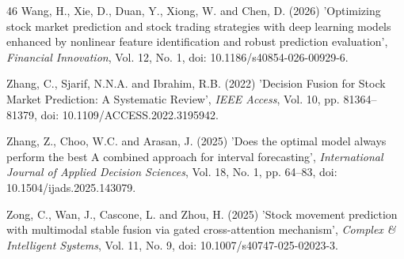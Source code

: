 \documentclass{singlecol-new}
\theoremstyle{TH}{
\newtheorem{lemma}{Lemma}
\newtheorem{theorem}[lemma]{Theorem}
\newtheorem{corrolary}[lemma]{Corrolary}
\newtheorem{conjecture}[lemma]{Conjecture}
\newtheorem{proposition}[lemma]{Proposition}
\newtheorem{claim}[lemma]{Claim}
\newtheorem{stheorem}[lemma]{Wrong Theorem}
\newtheorem{algorithm}{Algorithm}
}
\theoremstyle{THrm}{
\newtheorem{definition}{Definition}[section]
\newtheorem{question}{Question}[section]
\newtheorem{remark}{Remark}
\newtheorem{scheme}{Scheme}
}
\theoremstyle{THhit}{
\newtheorem{case}{Case}[section]
}
\begin{document}
\begin{thebibliography}{46}
Wang, H., Xie, D., Duan, Y., Xiong, W. and Chen, D. (2026) 'Optimizing stock market prediction and stock trading strategies with deep learning models enhanced by nonlinear feature identification and robust prediction evaluation', {\it Financial Innovation}, Vol. 12, No. 1, doi: 10.1186/s40854-026-00929-6.

Zhang, C., Sjarif, N.N.A. and Ibrahim, R.B. (2022) 'Decision Fusion for Stock Market Prediction: A Systematic Review', {\it IEEE Access}, Vol. 10, pp. 81364--81379, doi: 10.1109/ACCESS.2022.3195942.

Zhang, Z., Choo, W.C. and Arasan, J. (2025) 'Does the optimal model always perform the best A combined approach for interval forecasting', {\it International Journal of Applied Decision Sciences}, Vol. 18, No. 1, pp. 64--83, doi: 10.1504/ijads.2025.143079.

Zong, C., Wan, J., Cascone, L. and Zhou, H. (2025) 'Stock movement prediction with multimodal stable fusion via gated cross-attention mechanism', {\it Complex \& Intelligent Systems}, Vol. 11, No. 9, doi: 10.1007/s40747-025-02023-3.

\end{thebibliography}
\end{document}
